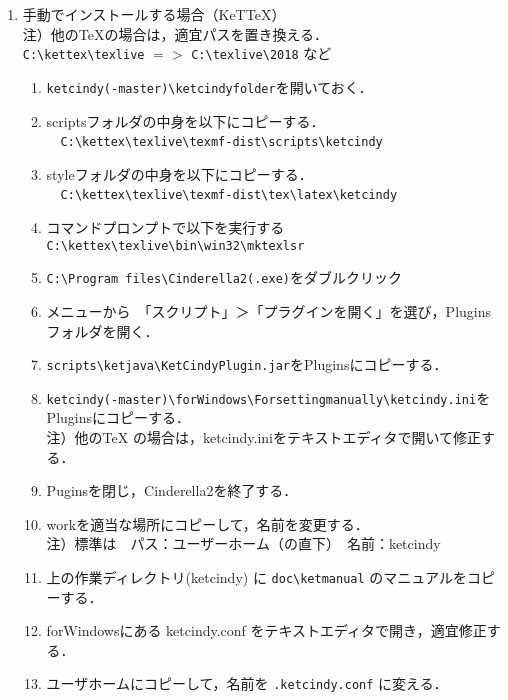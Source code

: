\documentclass{ujarticle}
\begin{document}
\begin{enumerate}[\bf\large 1.]
\item 手動でインストールする場合（KeTTeX）\\
\hspace*{1zw}注）他のTeXの場合は，適宜パスを置き換える．\\
\hspace*{3zw}\verb|C:\kettex\texlive| $=>$ \verb|C:\texlive\2018| など
  \begin{enumerate}[(1)]
  \item \verb|ketcindy(-master)\ketcindyfolder|を開いておく．
  \item scriptsフォルダの中身を以下にコピーする．\\
　\verb|C:\kettex\texlive\texmf-dist\scripts\ketcindy|
  \item styleフォルダの中身を以下にコピーする．\\
　\verb|C:\kettex\texlive\texmf-dist\tex\latex\ketcindy|
  \item コマンドプロンプトで以下を実行する\\
  \hspace*{1zw}\verb|C:\kettex\texlive\bin\win32\mktexlsr|
  \item \verb|C:\Program files\Cinderella2(.exe)|をダブルクリック
  \item メニューから　「スクリプト」＞「プラグインを開く」を選び，Pluginsフォルダを開く．
  \item \verb|scripts\ketjava\KetCindyPlugin.jar|をPluginsにコピーする．
  \item \verb|ketcindy(-master)\forWindows\Forsettingmanually\ketcindy.ini|をPluginsにコピーする．\\
  \hspace*{2zw}注）他のTeX の場合は，ketcindy.iniをテキストエディタで開いて修正する．
  \item Puginsを閉じ，Cinderella2を終了する．
  \item workを適当な場所にコピーして，名前を変更する．\\
\hspace*{2zw}注）標準は　パス：ユーザーホーム（の直下）　名前：ketcindy
  \item 上の作業ディレクトリ(ketcindy) に \verb|doc\ketmanual| のマニュアルをコピーする．
  \item forWindowsにある ketcindy.conf をテキストエディタで開き，適宜修正する．
  \item ユーザホームにコピーして，名前を \verb|.ketcindy.conf| に変える．
  \end{enumerate}
\end{enumerate}
\end{document}
